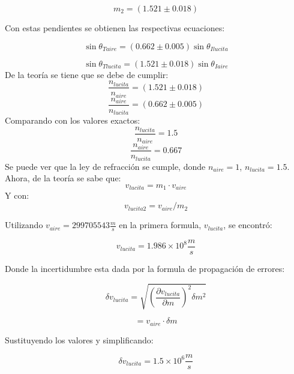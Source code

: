 \documentclass[DIV=calc, paper=a4, fontsize=11pt]{scrartcl}
\begin{document}
\begin{equation*}
    m_{2} = (1.521 \pm 0.018)
\end{equation*}

Con estas pendientes se obtienen las respectivas ecuaciones:

\begin{equation*}
    \sin{\theta_{Taire}}=(0.662 \pm 0.005)\sin{\theta_{Ilucita}}
\end{equation*}

\begin{equation*}
    \sin{\theta_{Tlucita}}=(1.521 \pm 0.018)\sin{\theta_{Iaire}}
\end{equation*}
De la teoría se tiene que se debe de cumplir:
$$ \frac{n_{lucita}}{n_{aire}}= (1.521 \pm 0.018)$$
$$ \frac{n_{aire}}{n_{lucita}}= (0.662 \pm 0.005)$$
Comparando con los valores exactos: %
$$ \frac{n_{lucita}}{n_{aire}}= 1.5 $$
$$ \frac{n_{aire}}{n_{lucita}}= 0.667 $$
Se puede ver que la ley de refracción se cumple, donde $n_{aire}=1$, $n_{lucita}=1.5$.
\\
Ahora, de la teoría se sabe  que:
\begin{equation*}
    v_{lucita}= m_{1} \cdot v_{aire}
\end{equation*}
Y con:
\begin{equation*}
    v_{lucita2}= v_{aire} / m_{2}
\end{equation*}

Utilizando $v_{aire} = 299705543 \frac{m}{s}$ en la primera formula, $v_{lucita}$, se encontró:


\begin{equation*}
    v_{lucita}  = 1.986 \times 10^{8} \frac{m}{s} 
\end{equation*}

Donde la incertidumbre esta dada por la formula de propagación de errores:

\begin{equation*}
    \delta v_{lucita} = \sqrt{\left(\frac{\partial v_{lucita}}{\partial m}\right)^2\delta m^2}
\end{equation*}

\begin{equation*}
    = v_{aire} \cdot \delta m
\end{equation*}

Sustituyendo los valores y simplificando:

\begin{equation*}
\delta v_{lucita} = 1.5 \times 10^{6} \frac{m}{s}
\end{equation*}
\end{document}
